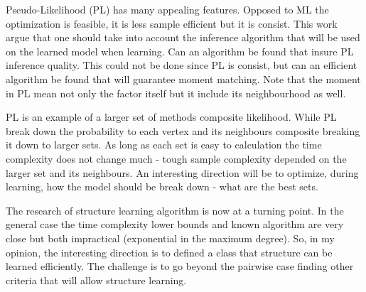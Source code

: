 Pseudo-Likelihood (PL) has many appealing features.
Opposed to ML the optimization is feasible, it is less sample efficient but it is consist.
This work argue that one should take into account the inference algorithm that will be used on the learned model when learning.
Can an algorithm be found that insure PL inference quality.
This could not be done since PL is consist, but can an efficient algorithm be found that will guarantee moment matching.
Note that the moment in PL mean not only the factor itself but it include its neighbourhood as well.

PL is an example of a larger set of methods composite likelihood.
While PL break down the probability to each vertex and its neighbours composite breaking it down to larger sets.
As long as each set is easy to calculation the time complexity does not change much - tough sample complexity depended on the larger set and its neighbours.
An interesting direction will be to optimize, during learning, how the model should be break down - what are the best sets.

The research of structure learning algorithm is now at a turning point.
In the general case the time complexity lower bounds and known algorithm are very close but both impractical (exponential in the maximum degree).
So, in my opinion, the interesting direction is to defined a class that structure can be learned efficiently.
The challenge is to go beyond the pairwise case finding other criteria that will allow structure learning.

